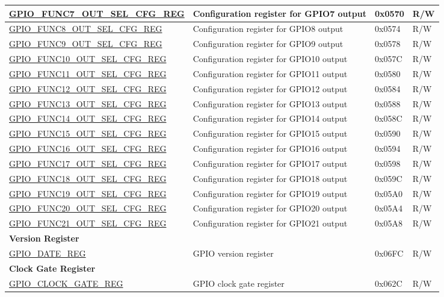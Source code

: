 \begin{longtable}{ | p{6cm} | p{7.2cm} | p{1.3cm} | p{1cm} | }
\hyperref[regdesc:GPIOFUNCNOUTSELCFGREG]{GPIO\_FUNC7\_OUT\_SEL\_CFG\_REG} & Configuration register for GPIO7 output & 0x0570 & R/W \\ \hline
\hyperref[regdesc:GPIOFUNCNOUTSELCFGREG]{GPIO\_FUNC8\_OUT\_SEL\_CFG\_REG} & Configuration register for GPIO8 output & 0x0574 & R/W \\ \hline
\hyperref[regdesc:GPIOFUNCNOUTSELCFGREG]{GPIO\_FUNC9\_OUT\_SEL\_CFG\_REG} & Configuration register for GPIO9 output & 0x0578 & R/W \\ \hline
\hyperref[regdesc:GPIOFUNCNOUTSELCFGREG]{GPIO\_FUNC10\_OUT\_SEL\_CFG\_REG} & Configuration register for GPIO10 output & 0x057C & R/W \\ \hline
\hyperref[regdesc:GPIOFUNCNOUTSELCFGREG]{GPIO\_FUNC11\_OUT\_SEL\_CFG\_REG} & Configuration register for GPIO11 output & 0x0580 & R/W \\ \hline
\hyperref[regdesc:GPIOFUNCNOUTSELCFGREG]{GPIO\_FUNC12\_OUT\_SEL\_CFG\_REG} & Configuration register for GPIO12 output & 0x0584 & R/W \\ \hline
\hyperref[regdesc:GPIOFUNCNOUTSELCFGREG]{GPIO\_FUNC13\_OUT\_SEL\_CFG\_REG} & Configuration register for GPIO13 output & 0x0588 & R/W \\ \hline
\hyperref[regdesc:GPIOFUNCNOUTSELCFGREG]{GPIO\_FUNC14\_OUT\_SEL\_CFG\_REG} & Configuration register for GPIO14 output & 0x058C & R/W \\ \hline
\hyperref[regdesc:GPIOFUNCNOUTSELCFGREG]{GPIO\_FUNC15\_OUT\_SEL\_CFG\_REG} & Configuration register for GPIO15 output & 0x0590 & R/W \\ \hline
\hyperref[regdesc:GPIOFUNCNOUTSELCFGREG]{GPIO\_FUNC16\_OUT\_SEL\_CFG\_REG} & Configuration register for GPIO16 output & 0x0594 & R/W \\ \hline
\hyperref[regdesc:GPIOFUNCNOUTSELCFGREG]{GPIO\_FUNC17\_OUT\_SEL\_CFG\_REG} & Configuration register for GPIO17 output & 0x0598 & R/W \\ \hline
\hyperref[regdesc:GPIOFUNCNOUTSELCFGREG]{GPIO\_FUNC18\_OUT\_SEL\_CFG\_REG} & Configuration register for GPIO18 output & 0x059C & R/W \\ \hline
\hyperref[regdesc:GPIOFUNCNOUTSELCFGREG]{GPIO\_FUNC19\_OUT\_SEL\_CFG\_REG} & Configuration register for GPIO19 output & 0x05A0 & R/W \\ \hline
\hyperref[regdesc:GPIOFUNCNOUTSELCFGREG]{GPIO\_FUNC20\_OUT\_SEL\_CFG\_REG} & Configuration register for GPIO20 output & 0x05A4 & R/W \\ \hline
\hyperref[regdesc:GPIOFUNCNOUTSELCFGREG]{GPIO\_FUNC21\_OUT\_SEL\_CFG\_REG} & Configuration register for GPIO21 output & 0x05A8 & R/W \\ \hline
\multicolumn{4}{|l|}{\textbf{Version Register}} \\ \hline
\hyperref[regdesc:GPIOREGDATEREGREG]{GPIO\_DATE\_REG} & GPIO version register & 0x06FC & R/W \\ \hline

\multicolumn{4}{|l|}{\textbf{Clock Gate Register}} \\ \hline
\hyperref[regdesc:GPIOCLOCKGATEREGREG]{GPIO\_CLOCK\_GATE\_REG} & GPIO clock gate register & 0x062C & R/W \\ \hline
\end{longtable}

